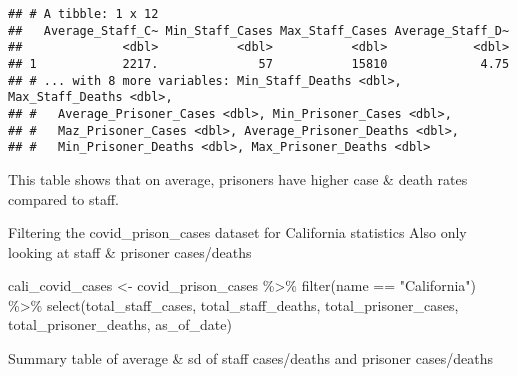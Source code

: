 \documentclass[
]{article}
\newenvironment{Shaded}{\begin{snugshade}}{\end{snugshade}}
\newcommand{\FunctionTok}[1]{\textcolor[rgb]{0.00,0.00,0.00}{#1}}
\newcommand{\NormalTok}[1]{#1}
\newcommand{\OtherTok}[1]{\textcolor[rgb]{0.56,0.35,0.01}{#1}}
\newcommand{\SpecialCharTok}[1]{\textcolor[rgb]{0.00,0.00,0.00}{#1}}
\newcommand{\StringTok}[1]{\textcolor[rgb]{0.31,0.60,0.02}{#1}}
\begin{document}
\begin{verbatim}
## # A tibble: 1 x 12
##   Average_Staff_C~ Min_Staff_Cases Max_Staff_Cases Average_Staff_D~
##              <dbl>           <dbl>           <dbl>            <dbl>
## 1            2217.              57           15810             4.75
## # ... with 8 more variables: Min_Staff_Deaths <dbl>, Max_Staff_Deaths <dbl>,
## #   Average_Prisoner_Cases <dbl>, Min_Prisoner_Cases <dbl>,
## #   Maz_Prisoner_Cases <dbl>, Average_Prisoner_Deaths <dbl>,
## #   Min_Prisoner_Deaths <dbl>, Max_Prisoner_Deaths <dbl>
\end{verbatim}

This table shows that on average, prisoners have higher case \& death
rates compared to staff.

Filtering the covid\_prison\_cases dataset for California statistics
Also only looking at staff \& prisoner cases/deaths

\begin{Shaded}
\begin{Highlighting}[]
\NormalTok{cali\_covid\_cases }\OtherTok{\textless{}{-}}\NormalTok{ covid\_prison\_cases }\SpecialCharTok{\%\textgreater{}\%}
  \FunctionTok{filter}\NormalTok{(name }\SpecialCharTok{==} \StringTok{"California"}\NormalTok{) }\SpecialCharTok{\%\textgreater{}\%}
  \FunctionTok{select}\NormalTok{(total\_staff\_cases, total\_staff\_deaths, total\_prisoner\_cases, total\_prisoner\_deaths, as\_of\_date)}
\end{Highlighting}
\end{Shaded}

Summary table of average \& sd of staff cases/deaths and prisoner
cases/deaths
\end{document}
